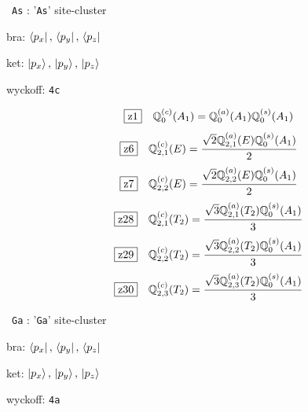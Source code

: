 \documentclass[fleqn,10pt,landscape]{jsarticle}
\begin{document}
\vspace{5mm}

\noindent\textbullet\, \texttt{As} : '\texttt{As}' site-cluster

\noindent\quad * bra: $\bra{p_{x}},\, \bra{p_{y}},\, \bra{p_{z}}$

\noindent\quad * ket: $\ket{p_{x}},\, \ket{p_{y}},\, \ket{p_{z}}$

\noindent\quad * wyckoff: \texttt{4c}

\begin{dmath*}
\hspace*{3mm}\fbox{z1}\quad \mathbb{Q}_{0}^{(c)}(A_{1})=\mathbb{Q}_{0}^{(a)}(A_{1}) \mathbb{Q}_{0}^{(s)}(A_{1})
\end{dmath*}
\begin{dmath*}
\hspace*{3mm}\fbox{z6}\quad \mathbb{Q}_{2,1}^{(c)}(E)=\frac{\sqrt{2} \mathbb{Q}_{2,1}^{(a)}(E) \mathbb{Q}_{0}^{(s)}(A_{1})}{2}
\end{dmath*}
\begin{dmath*}
\hspace*{3mm}\fbox{z7}\quad \mathbb{Q}_{2,2}^{(c)}(E)=\frac{\sqrt{2} \mathbb{Q}_{2,2}^{(a)}(E) \mathbb{Q}_{0}^{(s)}(A_{1})}{2}
\end{dmath*}
\begin{dmath*}
\hspace*{3mm}\fbox{z28}\quad \mathbb{Q}_{2,1}^{(c)}(T_{2})=\frac{\sqrt{3} \mathbb{Q}_{2,1}^{(a)}(T_{2}) \mathbb{Q}_{0}^{(s)}(A_{1})}{3}
\end{dmath*}
\begin{dmath*}
\hspace*{3mm}\fbox{z29}\quad \mathbb{Q}_{2,2}^{(c)}(T_{2})=\frac{\sqrt{3} \mathbb{Q}_{2,2}^{(a)}(T_{2}) \mathbb{Q}_{0}^{(s)}(A_{1})}{3}
\end{dmath*}
\begin{dmath*}
\hspace*{3mm}\fbox{z30}\quad \mathbb{Q}_{2,3}^{(c)}(T_{2})=\frac{\sqrt{3} \mathbb{Q}_{2,3}^{(a)}(T_{2}) \mathbb{Q}_{0}^{(s)}(A_{1})}{3}
\end{dmath*}
\vspace{5mm}

\noindent\textbullet\, \texttt{Ga} : '\texttt{Ga}' site-cluster

\noindent\quad * bra: $\bra{p_{x}},\, \bra{p_{y}},\, \bra{p_{z}}$

\noindent\quad * ket: $\ket{p_{x}},\, \ket{p_{y}},\, \ket{p_{z}}$

\noindent\quad * wyckoff: \texttt{4a}
\end{document}
